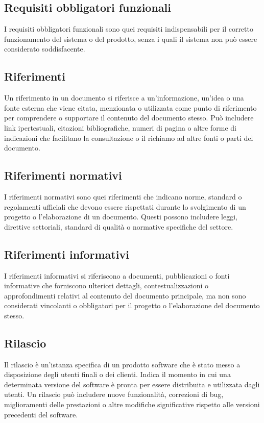\subsection*{Requisiti obbligatori funzionali} 
I requisiti obbligatori funzionali sono quei requisiti indispensabili per il corretto funzionamento del sistema o del prodotto, senza i quali il sistema non può essere considerato soddisfacente. 
\subsection*{Riferimenti} 
Un riferimento in un documento si riferisce a un'informazione, un'idea o una fonte esterna che viene citata, menzionata o utilizzata come punto di riferimento per comprendere o supportare il contenuto del documento stesso. Può includere link ipertestuali, citazioni bibliografiche, numeri di pagina o altre forme di indicazioni che facilitano la consultazione o il richiamo ad altre fonti o parti del documento. 
\subsection*{Riferimenti normativi} 
I riferimenti normativi sono quei riferimenti che indicano norme, standard o regolamenti ufficiali che devono essere rispettati durante lo svolgimento di un progetto o l'elaborazione di un documento. Questi possono includere leggi, direttive settoriali, standard di qualità o normative specifiche del settore.
\subsection*{Riferimenti informativi} 
I riferimenti informativi si riferiscono a documenti, pubblicazioni o fonti informative che forniscono ulteriori dettagli, contestualizzazioni o approfondimenti relativi al contenuto del documento principale, ma non sono considerati vincolanti o obbligatori per il progetto o l'elaborazione del documento stesso.
\subsection*{Rilascio} 
Il rilascio è un'istanza specifica di un prodotto software che è stato messo a disposizione degli utenti finali o dei clienti. Indica il momento in cui una determinata versione del software è pronta per essere distribuita e utilizzata dagli utenti. Un rilascio può includere nuove funzionalità, correzioni di bug, miglioramenti delle prestazioni o altre modifiche significative rispetto alle versioni precedenti del software. 
